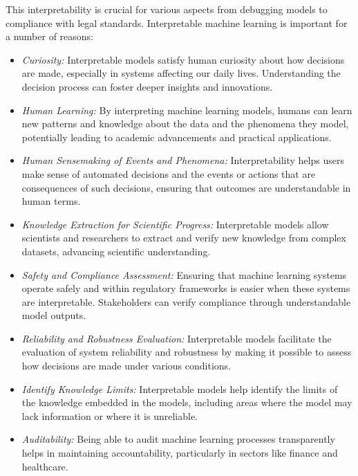 This interpretability is crucial for various aspects from debugging models to compliance with legal standards. Interpretable machine learning is important for a number of reasons:

\begin{itemize}
\item \emph{Curiosity:} Interpretable models satisfy human curiosity about how decisions are made, especially in systems affecting our daily lives. Understanding the decision process can foster deeper insights and innovations.

\item \emph{Human Learning:} By interpreting machine learning models, humans can learn new patterns and knowledge about the data and the phenomena they model, potentially leading to academic advancements and practical applications.

\item \emph{Human Sensemaking of Events and Phenomena:} Interpretability helps users make sense of automated decisions and the events or actions that are consequences of such decisions, ensuring that outcomes are understandable in human terms.

\item \emph{Knowledge Extraction for Scientific Progress:} Interpretable models allow scientists and researchers to extract and verify new knowledge from complex datasets, advancing scientific understanding.

\item \emph{Safety and Compliance Assessment:} Ensuring that machine learning systems operate safely and within regulatory frameworks is easier when these systems are interpretable. Stakeholders can verify compliance through understandable model outputs.

\item \emph{Reliability and Robustness Evaluation:} Interpretable models facilitate the evaluation of system reliability and robustness by making it possible to assess how decisions are made under various conditions.

\item \emph{Identify Knowledge Limits:} Interpretable models help identify the limits of the knowledge embedded in the models, including areas where the model may lack information or where it is unreliable.

\item \emph{Auditability:} Being able to audit machine learning processes transparently helps in maintaining accountability, particularly in sectors like finance and healthcare.


\end{itemize}
